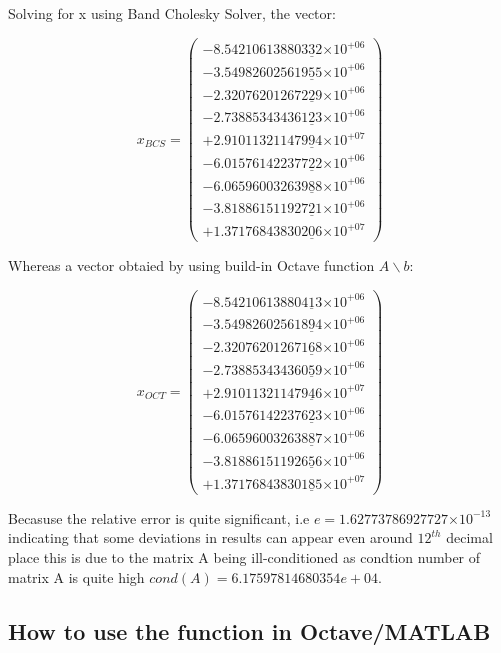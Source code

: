 \documentclass{article}
\providecommand{\e}[1]{\ensuremath{\times 10^{#1}}}
\begin{document}
Solving for x using Band Cholesky Solver, the vector: 

\[ x_{BCS} = \left(
\begin{array}{c}
  -8.54210613880\underline{332}\e{+06} \\
  -3.54982602561\underline{955}\e{+06} \\
  -2.32076201267\underline{229}\e{+06} \\
  -2.73885343436\underline{123}\e{+06} \\
  +2.91011321147\underline{994}\e{+07} \\
  -6.01576142237\underline{722}\e{+06} \\
  -6.06596003263\underline{988}\e{+06} \\
  -3.81886151192\underline{721}\e{+06} \\
  +1.37176843830\underline{206}\e{+07}
\end{array} \right)
\]

Whereas a vector obtaied by using build-in Octave function $A \backslash b$:

\[ x_{OCT} = \left(
\begin{array}{c}
  -8.54210613880\underline{413}\e{+06} \\ 
  -3.54982602561\underline{894}\e{+06} \\
  -2.32076201267\underline{168}\e{+06} \\
  -2.73885343436\underline{059}\e{+06} \\
  +2.91011321147\underline{946}\e{+07} \\
  -6.01576142237\underline{623}\e{+06} \\
  -6.06596003263\underline{887}\e{+06} \\
  -3.81886151192\underline{656}\e{+06} \\
  +1.37176843830\underline{185}\e{+07}
\end{array} \right)
\]

Becasuse the relative error is quite significant, i.e $e =
1.62773786927727\e{-13}$ indicating that some deviations in results can appear 
even around $12^{th}$ decimal place this is due to the matrix A being 
ill-conditioned as condtion number of matrix A is quite high $cond(A) = 
6.17597814680354e+04$.

\subsection{How to use the function in Octave/MATLAB}
\end{document}
